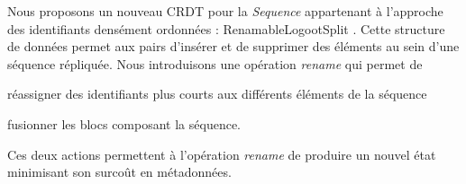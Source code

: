 Nous proposons un nouveau \ac{CRDT} pour la \emph{Sequence} appartenant à l'approche des identifiants densément ordonnées : RenamableLogootSplit \cite{2020-rls-papoc-nicolas,2022-rls-tpds-nicolas}.
Cette structure de données permet aux pairs d'insérer et de supprimer des éléments au sein d'une séquence répliquée.
Nous introduisons une opération \emph{rename} qui permet de
\begin{enumerate*}
  \item réassigner des identifiants plus courts aux différents éléments de la séquence
  \item fusionner les blocs composant la séquence.
\end{enumerate*}
Ces deux actions permettent à l'opération \emph{rename} de produire un nouvel état minimisant son surcoût en métadonnées.
